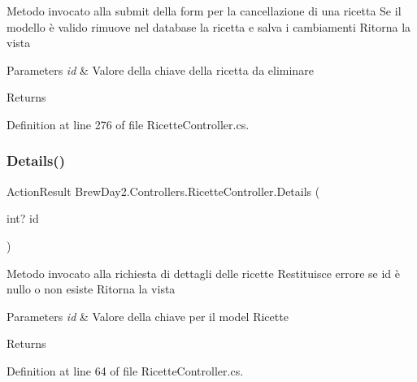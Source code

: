 Metodo invocato alla submit della form per la cancellazione di una ricetta Se il modello è valido rimuove nel database la ricetta e salva i cambiamenti Ritorna la vista 


\begin{DoxyParams}{Parameters}
{\em id} & Valore della chiave della ricetta da eliminare\\
\hline
\end{DoxyParams}
\begin{DoxyReturn}{Returns}

\end{DoxyReturn}


Definition at line 276 of file Ricette\+Controller.\+cs.

\mbox{\label{class_brew_day2_1_1_controllers_1_1_ricette_controller_a24c992c1f4be3d406b27d6a8fb46dbda}} 
\subsubsection{\texorpdfstring{Details()}{Details()}}
{\footnotesize\ttfamily Action\+Result Brew\+Day2.\+Controllers.\+Ricette\+Controller.\+Details (\begin{DoxyParamCaption}\item[{int?}]{id }\end{DoxyParamCaption})}



Metodo invocato alla richiesta di dettagli delle ricette Restituisce errore se id è nullo o non esiste Ritorna la vista 


\begin{DoxyParams}{Parameters}
{\em id} & Valore della chiave per il model Ricette\\
\hline
\end{DoxyParams}
\begin{DoxyReturn}{Returns}

\end{DoxyReturn}


Definition at line 64 of file Ricette\+Controller.\+cs.

\mbox{\label{class_brew_day2_1_1_controllers_1_1_ricette_controller_afde9e7996a273f2d266002af7ca6caa7}} 
